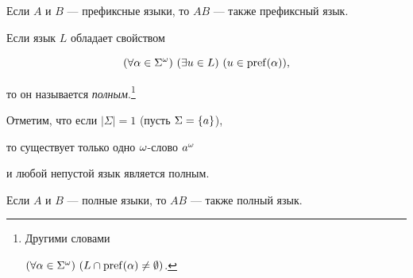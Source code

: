  \begin{props} \label{upr}


 Если $A$ и $B$ --- префиксные языки, то $AB$ --- также префиксный язык.


 \end{props}





 \begin{defns} \label{poln}


 Если язык $L$ обладает свойством


 $$


 (\forall \alpha\in\Sigma^\om)\ 


 (\exists u\in L)\ 


 (u\in\pref(\alpha)),


 $$


 то он называется {\it полным}.\footnote{Другими словами


$(\forall \alpha\in\Sigma^\om)\ 


(L\cap\pref(\alpha) \ne \emptyset)$.}


 \end{defns}


\setcounter{footnote}{0}





 Отметим, что если $|\Sigma|=1$ (пусть $\Sigma=\{ a \}$),


 то существует только одно $\omega$-слово $a^\omega$ 


 и любой непустой язык является полным.





 \begin{props} \label{up}


 Если $A$ и $B$ --- полные языки, то $AB$ --- также полный язык.


 \end{props}





